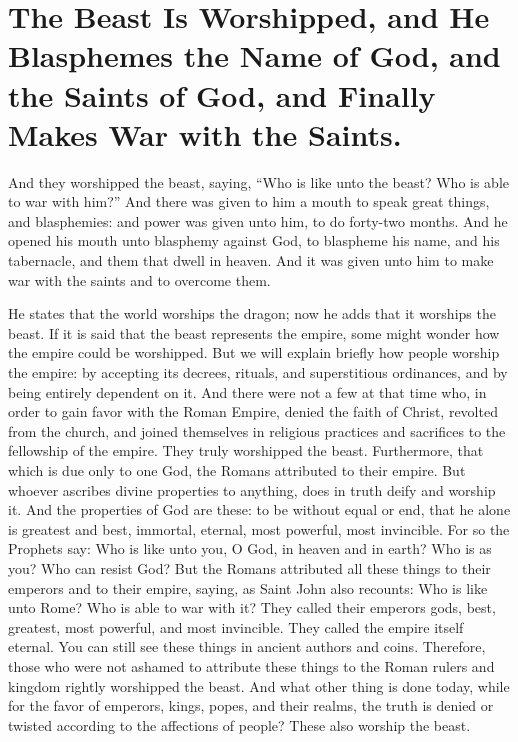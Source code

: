 \chapter[Sermon 56. The Beast Is Worshipped, and He Blasphemes the Name of God, and the Saints of God, and Finally Makes War with the Saints.]{The Beast Is Worshipped, and He Blasphemes the Name of God, and the Saints of God, and Finally Makes War with the Saints.}
\label{sermon:056}

And they worshipped the beast, saying, “Who is like unto the beast? Who is able to war with him?” And there was given to him a mouth to speak great things, and blasphemies: and power was given unto him, to do forty-two months. And he opened his mouth unto blasphemy against God, to blaspheme his name, and his tabernacle, and them that dwell in heaven. And it was given unto him to make war with the saints and to overcome them.

He states that the world worships the dragon; now he adds that it worships the beast. If it is said that the beast represents the empire, some might wonder how the empire could be worshipped. But we will explain briefly how people worship the empire: by accepting its decrees, rituals, and superstitious ordinances, and by being entirely dependent on it. And there were not a few at that time who, in order to gain favor with the Roman Empire, denied the faith of Christ, revolted from the church, and joined themselves in religious practices and sacrifices to the fellowship of the empire. They truly worshipped the beast. Furthermore, that which is due only to one God, the Romans attributed to their empire. But whoever ascribes divine properties to anything, does in truth deify and worship it. And the properties of God are these: to be without equal or end, that he alone is greatest and best, immortal, eternal, most powerful, most invincible. For so the Prophets say: Who is like unto you, O God, in heaven and in earth? Who is as you? Who can resist God? But the Romans attributed all these things to their emperors and to their empire, saying, as Saint John also recounts: Who is like unto Rome? Who is able to war with it? They called their emperors gods, best, greatest, most powerful, and most invincible. They called the empire itself eternal. You can still see these things in ancient authors and coins. Therefore, those who were not ashamed to attribute these things to the Roman rulers and kingdom rightly worshipped the beast. And what other thing is done today, while for the favor of emperors, kings, popes, and their realms, the truth is denied or twisted according to the affections of people? These also worship the beast.

